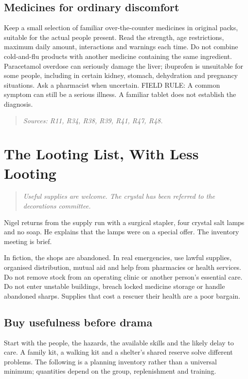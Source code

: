\documentclass[10pt,openright]{book}
\begin{document}
\section*{Medicines for ordinary discomfort}
Keep a small selection of familiar over-the-counter medicines in original packs, suitable for the actual people present. Read the strength, age restrictions, maximum daily amount, interactions and warnings each time. Do not combine cold-and-flu products with another medicine containing the same ingredient. Paracetamol overdose can seriously damage the liver; ibuprofen is unsuitable for some people, including in certain kidney, stomach, dehydration and pregnancy situations. Ask a pharmacist when uncertain. FIELD RULE: A common symptom can still be a serious illness. A familiar tablet does not establish the diagnosis.

\begin{quote}\emph{Sources: R11, R34, R38, R39, R41, R47, R48.}\end{quote}
\chapter{The Looting List, With Less Looting}
\begin{quote}\emph{Useful supplies are welcome. The crystal has been referred to the decorations committee.}\end{quote}
Nigel returns from the supply run with a surgical stapler, four crystal salt lamps and no soap. He explains that the lamps were on a special offer. The inventory meeting is brief.

In fiction, the shops are abandoned. In real emergencies, use lawful supplies, organised distribution, mutual aid and help from pharmacies or health services. Do not remove stock from an operating clinic or another person's essential care. Do not enter unstable buildings, breach locked medicine storage or handle abandoned sharps. Supplies that cost a rescuer their health are a poor bargain.

\section*{Buy usefulness before drama}
Start with the people, the hazards, the available skills and the likely delay to care. A family kit, a walking kit and a shelter's shared reserve solve different problems. The following is a planning inventory rather than a universal minimum; quantities depend on the group, replenishment and training.
\end{document}
